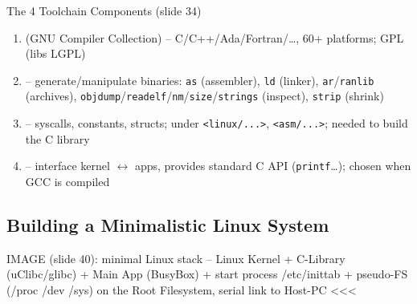 \begin{definition}{The 4 Toolchain Components (slide 34)}
    \begin{enumerate}
        \item {} (GNU Compiler Collection) -- C/C++/Ada/Fortran/\dots,
              60+ platforms; GPL (libs LGPL)
        \item {} -- generate/manipulate binaries:
              \texttt{as} (assembler), \texttt{ld} (linker), \texttt{ar}/\texttt{ranlib}
              (archives), \texttt{objdump}/\texttt{readelf}/\texttt{nm}/\texttt{size}/\texttt{strings}
              (inspect), \texttt{strip} (shrink)
        \item {} -- syscalls, constants, structs;
              under \texttt{<linux/...>}, \texttt{<asm/...>}; needed to build the C library
        \item {} -- interface kernel $\leftrightarrow$ apps, provides
              standard C API (\texttt{printf}\dots); chosen when GCC is compiled
    \end{enumerate}
\end{definition}

\subsection{Building a Minimalistic Linux System}

IMAGE (slide 40): minimal Linux stack -- Linux Kernel + C-Library (uClibc/glibc) + Main App (BusyBox) + start process /etc/inittab + pseudo-FS (/proc /dev /sys) on the Root Filesystem, serial link to Host-PC <<<

